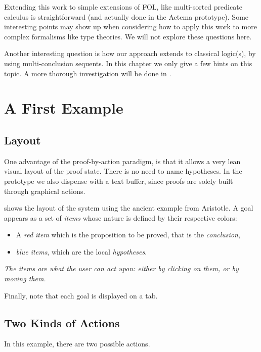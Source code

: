 Extending this work to simple extensions of FOL, like multi-sorted predicate
calculus is straightforward (and actually done in the Actema prototype).  Some
interesting points may show up when considering how to apply this work to more
complex formalisms like type theories. We will not explore these questions here.

Another interesting question is how our approach extends to classical logic(s),
by using multi-conclusion sequents. In this chapter we only give a few hints on
this topic. A more thorough investigation will be done in
.

\section{A First Example}

\subsection{Layout}
One advantage of the proof-by-action paradigm, is that it allows a very lean
visual layout of the proof state. There is no need to name hypotheses. In the
prototype we also dispense with a text buffer, since proofs are solely built
through graphical actions.


 shows the layout of the system using the
ancient example from Aristotle. A goal appears as a set of {\em items}
whose nature is defined by their respective colors:
\begin{itemize}
\item A {\em red item} which is the proposition to be proved, that is the
 {\em conclusion},
\item {\em blue items}, which are the local {\em hypotheses}.
\end{itemize}

{\em The items are what the user can act upon: either by {\em clicking} on
them, or by {\em moving} them.}

Finally, note that each goal is displayed on a tab.

\subsection{Two Kinds of Actions}
In this example, there are two possible actions.

